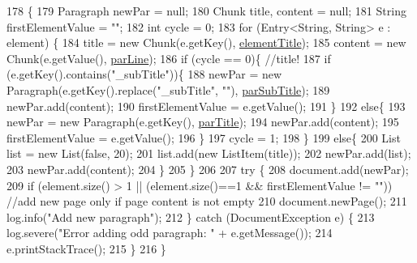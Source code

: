 \begin{DoxyCode}
178                                                                                      \{
179         Paragraph newPar = null;
180         Chunk title, content = null;
181         String firstElementValue = \textcolor{stringliteral}{""};
182         \textcolor{keywordtype}{int} cycle = 0;
183         \textcolor{keywordflow}{for} (Entry<String, String> e : element) \{
184             title = \textcolor{keyword}{new} Chunk(e.getKey(), \hyperlink{classit_1_1isislab_1_1masonhelperdocumentation_1_1mason_1_1control_1_1_p_d_f_generator_aef4e775d865ce931436933184abfcafa}{elementTitle});
185             content = \textcolor{keyword}{new} Chunk(e.getValue(), \hyperlink{classit_1_1isislab_1_1masonhelperdocumentation_1_1mason_1_1control_1_1_p_d_f_generator_a4887bc031c4ee6469cf807e7cd1afca6}{parLine});
186             \textcolor{keywordflow}{if} (cycle == 0)\{    \textcolor{comment}{//title!}
187                 \textcolor{keywordflow}{if} (e.getKey().contains(\textcolor{stringliteral}{"\_subTitle"}))\{
188                     newPar = \textcolor{keyword}{new} Paragraph(e.getKey().replace(\textcolor{stringliteral}{"\_subTitle"}, \textcolor{stringliteral}{""}), 
      \hyperlink{classit_1_1isislab_1_1masonhelperdocumentation_1_1mason_1_1control_1_1_p_d_f_generator_ac4f2d6c81c14b60dcddfc358b9296ee5}{parSubTitle});
189                     newPar.add(content);
190                     firstElementValue = e.getValue();
191                 \}
192                 \textcolor{keywordflow}{else}\{
193                     newPar = \textcolor{keyword}{new} Paragraph(e.getKey(), \hyperlink{classit_1_1isislab_1_1masonhelperdocumentation_1_1mason_1_1control_1_1_p_d_f_generator_a74f4e5e2095668aa762c3c3df4325c74}{parTitle});
194                     newPar.add(content);
195                     firstElementValue = e.getValue();
196                 \}
197                 cycle = 1;
198             \}
199             \textcolor{keywordflow}{else}\{
200                 List list = \textcolor{keyword}{new} List(\textcolor{keyword}{false}, 20);
201                 list.add(\textcolor{keyword}{new} ListItem(title));
202                 newPar.add(list);
203                 newPar.add(content);
204             \}
205         \}
206 
207         \textcolor{keywordflow}{try} \{           
208             document.add(newPar);
209             \textcolor{keywordflow}{if} (element.size() > 1 || (element.size()==1 && firstElementValue != \textcolor{stringliteral}{""}))   \textcolor{comment}{//add new page only
       if page content is not empty}
210                 document.newPage();
211             log.info(\textcolor{stringliteral}{"Add new paragraph"});
212         \} \textcolor{keywordflow}{catch} (DocumentException e) \{
213             log.severe(\textcolor{stringliteral}{"Error adding odd paragraph: "} + e.getMessage());
214             e.printStackTrace();
215         \}
216     \}
\end{DoxyCode}


